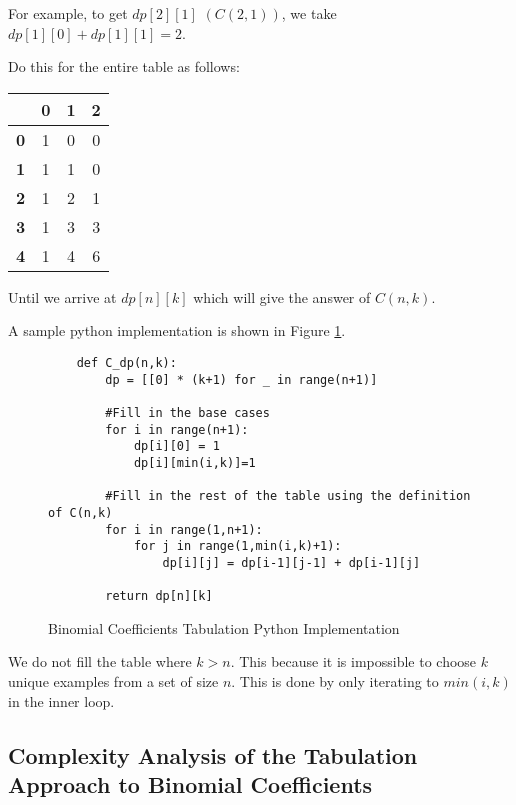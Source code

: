 For example, to get $dp[2][1]$ $(C(2,1))$, we take $dp[1][0] + dp[1][1] = 2$.

Do this for the entire table as follows:

\begin{table}[htbp]
    \centering
    \begin{tabular}{|c|c|c|c|}
        \hline
          & \textbf{0} & \textbf{1} & \textbf{2} \\
        \hline
        \textbf{0} & 1 & 0 & 0 \\
        \hline
        \textbf{1} & 1 & 1 & 0 \\
        \hline
        \textbf{2} & 1 & 2 & 1 \\
        \hline
        \textbf{3} & 1 & 3 & 3 \\
        \hline
        \textbf{4} & 1 & 4 & 6 \\
        \hline
    \end{tabular}
\end{table}

Until we arrive at $dp[n][k]$ which will give the answer of $C(n,k)$.

A sample python implementation is shown in Figure \ref{fig:binomial-dp}.

\begin{figure}[H]
    \centering
    \begin{lstlisting}
    def C_dp(n,k):
        dp = [[0] * (k+1) for _ in range(n+1)]
    
        #Fill in the base cases
        for i in range(n+1):
            dp[i][0] = 1
            dp[i][min(i,k)]=1
    
        #Fill in the rest of the table using the definition of C(n,k)
        for i in range(1,n+1):
            for j in range(1,min(i,k)+1):
                dp[i][j] = dp[i-1][j-1] + dp[i-1][j]
                
        return dp[n][k]
    \end{lstlisting}
    \caption{Binomial Coefficients Tabulation Python Implementation}
    \label{fig:binomial-dp}
\end{figure}

We do not fill the table where $k > n$.
This because it is impossible to choose $k$ unique examples from a set of size $n$.
This is done by only iterating to $min(i,k)$ in the inner loop.

\subsection{Complexity Analysis of the Tabulation Approach to Binomial Coefficients}

